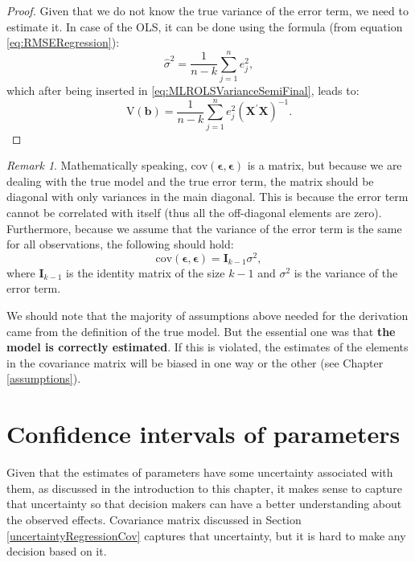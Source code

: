 \documentclass[
]{book}
\theoremstyle{definition}
\theoremstyle{definition}
\theoremstyle{definition}
\theoremstyle{definition}
\theoremstyle{remark}
\newtheorem*{remark}{Remark}
\begin{document}
\begin{proof}
Given that we do not know the true variance of the error term, we need to estimate it. In case of the OLS, it can be done using the formula (from equation \eqref{eq:RMSERegression}):
\begin{equation*}
\hat{\sigma}^2 = \frac{1}{n-k} \sum_{j=1}^n e_j^2 ,
\end{equation*}
which after being inserted in \eqref{eq:MLROLSVarianceSemiFinal}, leads to:
\begin{equation}
\mathrm{V}\left( {\boldsymbol{b}} \right) = \frac{1}{n-k} \sum_{j=1}^n e_j^2 \left( {\mathbf{X}}^\prime {\mathbf{X}} \right)^{-1} .
\label{eq:MLROLSVarianceFinal}
\end{equation}
\end{proof}

\begin{remark}
Mathematically speaking, \(\mathrm{cov} \left( {\boldsymbol{\epsilon}}, {\boldsymbol{\epsilon}} \right)\) is a matrix, but because we are dealing with the true model and the true error term, the matrix should be diagonal with only variances in the main diagonal. This is because the error term cannot be correlated with itself (thus all the off-diagonal elements are zero). Furthermore, because we assume that the variance of the error term is the same for all observations, the following should hold:
\begin{equation*}
\mathrm{cov} \left( {\boldsymbol{\epsilon}}, {\boldsymbol{\epsilon}} \right) = \mathbf{I}_{k-1} \sigma^2,
\end{equation*}
where \(\mathbf{I}_{k-1}\) is the identity matrix of the size \(k-1\) and \(\sigma^2\) is the variance of the error term.
\end{remark}

We should note that the majority of assumptions above needed for the derivation came from the definition of the true model. But the essential one was that \textbf{the model is correctly estimated}. If this is violated, the estimates of the elements in the covariance matrix will be biased in one way or the other (see Chapter \ref{assumptions}).

\section{Confidence intervals of parameters}\label{uncertaintyRegressionCI}

Given that the estimates of parameters have some uncertainty associated with them, as discussed in the introduction to this chapter, it makes sense to capture that uncertainty so that decision makers can have a better understanding about the observed effects. Covariance matrix discussed in Section \ref{uncertaintyRegressionCov} captures that uncertainty, but it is hard to make any decision based on it.
\end{document}
